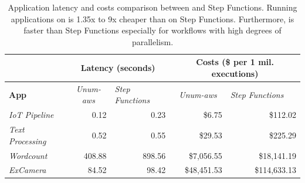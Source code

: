 \begin{table}[t]
  \centering
  \begin{tabular}{|l|rr|rr|}
\hline
                         & \multicolumn{2}{c|}{\textbf{Latency (seconds)}} & \multicolumn{2}{c|}{\textbf{Costs (\$ per 1 mil. executions)}} \\ \hline
\textbf{App} &
  \multicolumn{1}{c|}{\textit{Unum-aws}} &
  \multicolumn{1}{l|}{\textit{Step Functions}} &
  \multicolumn{1}{c|}{\textit{Unum-aws}} &
  \multicolumn{1}{l|}{\textit{Step Functions}} \\ \hline
\textit{IoT Pipeline}    & \multicolumn{1}{r|}{0.12}         & 0.23        & \multicolumn{1}{r|}{\$6.75}              & \$112.02            \\ \hline
\textit{Text Processing} & \multicolumn{1}{r|}{0.52}         & 0.55        & \multicolumn{1}{r|}{\$29.53}             & \$225.29            \\ \hline
\textit{Wordcount}       & \multicolumn{1}{r|}{408.88}       & 898.56      & \multicolumn{1}{r|}{\$7,056.55}          & \$18,141.19         \\ \hline
\textit{ExCamera}        & \multicolumn{1}{r|}{84.52}        & 98.42       & \multicolumn{1}{r|}{\$48,451.53}         & \$114,633.13        \\ \hline
\end{tabular}
  \caption{Application latency and costs comparison between \name{} and Step
    Functions. Running applications on \name{} is 1.35x to 9x cheaper than
    on Step Functions. Furthermore, \name{} is faster than Step Functions
    especially for workflows with high degrees of parallelism.}
  \label{table:macro}
\end{table}

